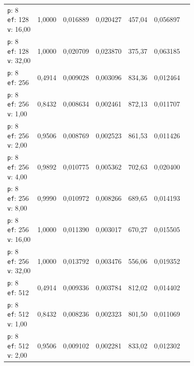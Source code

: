 \begin{table}[htbp]
\begin{tabularx}{\textwidth}{Xrrrrrr}
    \makecell{\texttt{p}: 8\\\texttt{ef}: 128\\\texttt{v}: 16,00} & 1,0000 & 0,016889 & 0,020427 & 457,04 & 0,056897 \\
    \makecell{\texttt{p}: 8\\\texttt{ef}: 128\\\texttt{v}: 32,00} & 1,0000 & 0,020709 & 0,023870 & 375,37 & 0,063185 \\
    \makecell{\texttt{p}: 8\\\texttt{ef}: 256} & 0,4914 & 0,009028 & 0,003096 & 834,36 & 0,012464 \\
    \makecell{\texttt{p}: 8\\\texttt{ef}: 256\\\texttt{v}: 1,00} & 0,8432 & 0,008634 & 0,002461 & 872,13 & 0,011707 \\
    \makecell{\texttt{p}: 8\\\texttt{ef}: 256\\\texttt{v}: 2,00} & 0,9506 & 0,008769 & 0,002523 & 861,53 & 0,011426 \\
    \makecell{\texttt{p}: 8\\\texttt{ef}: 256\\\texttt{v}: 4,00} & 0,9892 & 0,010775 & 0,005362 & 702,63 & 0,020400 \\
    \makecell{\texttt{p}: 8\\\texttt{ef}: 256\\\texttt{v}: 8,00} & 0,9990 & 0,010972 & 0,008266 & 689,65 & 0,014193 \\
    \makecell{\texttt{p}: 8\\\texttt{ef}: 256\\\texttt{v}: 16,00} & 1,0000 & 0,011390 & 0,003017 & 670,27 & 0,015505 \\
    \makecell{\texttt{p}: 8\\\texttt{ef}: 256\\\texttt{v}: 32,00} & 1,0000 & 0,013792 & 0,003476 & 556,06 & 0,019352 \\
    \makecell{\texttt{p}: 8\\\texttt{ef}: 512} & 0,4914 & 0,009336 & 0,003784 & 812,02 & 0,014402 \\
    \makecell{\texttt{p}: 8\\\texttt{ef}: 512\\\texttt{v}: 1,00} & 0,8432 & 0,008236 & 0,002323 & 801,50 & 0,011069 \\
    \makecell{\texttt{p}: 8\\\texttt{ef}: 512\\\texttt{v}: 2,00} & 0,9506 & 0,009102 & 0,002281 & 833,02 & 0,012302 \\

\end{tabularx}
\end{table}
